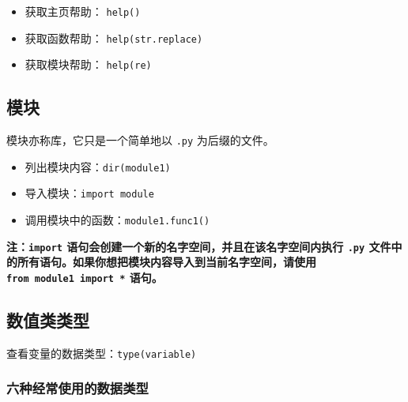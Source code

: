 \documentclass[]{article}
\begin{document}
\begin{itemize}
\item
  获取主页帮助： \texttt{help()}
\item
  获取函数帮助： \texttt{help(str.replace)}
\item
  获取模块帮助： \texttt{help(re)}
\end{itemize}

\hypertarget{header-n54}{\subsection{模块}\label{header-n54}}

模块亦称库，它只是一个简单地以 \texttt{.py} 为后缀的文件。

\begin{itemize}
\item
  列出模块内容：\texttt{dir(module1)}
\item
  导入模块：\texttt{import\ module}
\item
  调用模块中的函数：\texttt{module1.func1()}
\end{itemize}

\textbf{注：\texttt{import}
语句会创建一个新的名字空间，并且在该名字空间内执行 \texttt{.py}
文件中的所有语句。如果你想把模块内容导入到当前名字空间，请使用
\texttt{from\ module1\ import\ *} 语句。}

\hypertarget{header-n69}{\subsection{数值类类型}\label{header-n69}}

查看变量的数据类型：\texttt{type(variable)}

\subsubsection{六种经常使用的数据类型}\label{header-n72}
\end{document}
